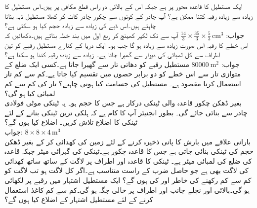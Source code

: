 ایک مستطیل کا قاعدہ  محور پر ہے جبکہ اس کے بالائی دو راس قطع مکافی  پر ہیں۔اس مستطیل کا زیادہ سے زیادہ رقبہ کتنا ممکن ہے؟
آپ   چادر کے کونوں سے چکور چادر کاٹ کر کھلا مستطیل ڈبہ بنانا چاہتے ہیں۔اس ڈبے کی زیادہ سے زیادہ حجم کیا ہو سکتی ہے؟\\
جواب:\quad
$\tfrac{14}{3}\times \tfrac{35}{3}\times\tfrac{5}{3}\,\si{\centi\meter\cubed}$
آپ  سے  تک لکیر کھینچ کر ربع اول میں بند خطہ بناتے ہیں۔دکھائیں کہ اس خطے کا رقبہ اس صورت زیادہ سے زیادہ ہو گا جب  ہو۔ 
ایک دریا کے کنارے مستطیل رقبے کو تین اطراف سے  کل لمبائی کی دیوار سے گھیرا جاتا ہے۔ زیادہ سے زیادہ رقبہ کتنا ہو سکتا ہے؟\\
جواب:\quad
$\SI{80000}{\meter\squared}$
 مستطیل رقبے کو دھاتی تار سے گھیرا جاتا ہے۔کسی ایک ضلع کے متوازی تار سے اس خطے کو دو برابر حصوں میں تقسیم کیا جاتا ہے۔کم سے کم تار استعمال کرنا مقصود ہے۔ مستطیل کی جسامت کیا ہونی چاہیے؟ تار کی کم سے کم لمبائی کیا ہو گی؟  
\\
بغیر ڈھکن چکور قاعدہ والی ٹینکی درکار ہے جس کا حجم  ہو۔ یہ ٹینکی  موٹی فولادی چادر سے بنائی جائے گی۔ بطور انجنیئر آپ کا کام ہے کہ ہلکی ترین ٹینکی بنانے کے لئے ٹینکی کا اضلاع تلاش کریں۔ اضلاع کیا ہوں گے؟\\
جواب:\quad
$8\times 8\times 4\,\si{\meter\cubed}$
\\
بارانی علاقے میں بارش کا پانی ذخیرہ کرنے کے لئے زمین کی  کھدائی کر کے  بغیر ڈھکن  حجم کی ٹینکی بنائی جاتی ہے جس کا قاعدہ چکور ہے۔ٹینکی کی گہرائی  میٹر جبکہ قاعدہ کی ضلع کی لمبائی  میٹر ہے۔ ٹینکی کا قاعدہ اور اطراف پر لاگت کے ساتھ ساتھ کھدائی کی لاگت بھی ہے جو حاصل ضرب  کے راست متناسب ہے۔اگر کل لاگت   ہو تب لاگت کو کم سے کم رکھنے کی خاطر  اور   کی ہوں گے؟ 
ایک مستطیل اشتہار میں  رقبے پر لکھائی ہو گی۔بالائی اور نچلے جانب  اور اطراف پر  خالی جگہ ہو گی۔کم سے کم کاغذ استعمال کرنے کے لئے مستطیل اشتہار کے اضلاع کیا ہوں گے؟ \\
